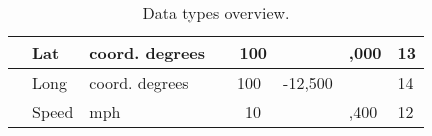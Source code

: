 \begin{table}[h]
\begin{center}
\begin{tabular}{| L{1.4cm} || L{2cm} | L{2.3cm} |  C{1.1cm} |  C{1.7cm} |  C{1.7cm} | C{1.2cm} |}
                     & Lat         & coord. degrees  & \ \ 100         &       & ,000   & 13   \\\hline
                     & Long        & coord. degrees  & \ \ 100         & -12,500       &        & 14   \\\hline
                     & Speed       & mph             & \ \ \ 10        &       & ,400   & 12   \\\hline
    \toprule[0.1mm]
    \end{tabular}
    \caption{Data types overview.}
    \label{datasets:table:scale}
\end{center}
\end{table}


